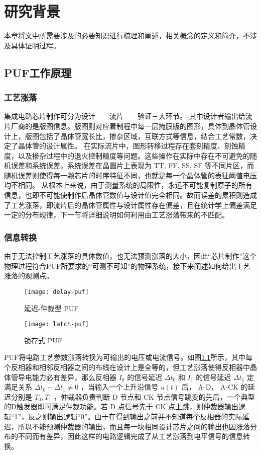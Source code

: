
\chapter{研究背景}\label{chap:preliminary}
本章将文中所需要涉及的必要知识进行梳理和阐述，相关概念的定义和简介，不涉及具体证明过程。

\section{PUF工作原理}%
\subsection{工艺涨落}%
集成电路芯片制作可分为设计——流片——验证三大环节。
其中设计者输出给流片厂商的是版图信息。版图则对应着制程中每一层掩膜版的图形，具体到晶体管设计上，版图包括了晶体管宽长比，掺杂区域，互联方式等信息，结合工艺常数，决定了晶体管的设计属性。
在实际流片中，图形转移过程存在套刻精度、刻蚀精度，以及掺杂过程中的退火控制精度等问题。这些操作在实际中存在不可避免的随机误差和系统误差。系统误差在晶圆片上表现为 TT, FF, SS, SF 等不同片区，而随机误差则使得每一颗芯片的时序特征不同，也就是每一个晶体管的表征阈值电压均不相同。
从根本上来说，由于测量系统的局限性，永远不可能复制原子的所有信息，也即不可能使制作后晶体管数值与设计值完全相同。故而误差的累积则造成了工艺涨落，即流片后的晶体管属性与设计属性存在偏差，且在统计学上偏差满足一定的分布规律，下一节将详细说明如何利用由工艺涨落带来的不匹配。
\subsection{信息转换}
由于无法控制工艺涨落的具体数值，也无法预测涨落的大小，因此``芯片制作''这个物理过程符合PUF所要求的``可测不可知''的物理系统，接下来阐述如何给出工艺涨落的观测点。

\begin{figure}[htb!]
\centering
\texttt{[image: delay-puf]}
\caption{延迟-仲裁型 PUF}
\label{fig:delay-puf}
\end{figure}
 
 \begin{figure}[htb!]
 \centering
 \texttt{[image: latch-puf]}
 \caption{锁存式 PUF}
 \label{fig:latch-puf}
 \end{figure}

PUF将电路工艺参数涨落转换为可输出的电压或电流信号。如图\ref{fig:delay-puf}所示，其中每个反相器和相邻反相器之间的布线在设计上是全等的，但工艺涨落使得反相器中晶体管导电能力必有差异，那么反相器 $ I_0 $ 的信号延迟 $ \Delta t_0 $ 和 $ I_1 $ 的信号延迟 $ \Delta t_1 $ 定满足关系 $ \Delta t_0-\Delta t_1\neq 0 $ ，当输入一个上升沿信号 $ u(t) $ 后， A-D， A-CK  的延迟分别是 $ T_0,T_1 $ ，仲裁器负责判断 D 节点和 CK 节点信号跳变的先后，一个典型的D触发器即可满足仲裁功能。若 D 点信号先于 CK 点上跳，则仲裁器输出逻辑``1''，反之则输出逻辑``0''。由于在得到输出之前并不知道每个反相器的实际延迟，所以不能预测仲裁器的输出，而且每一块相同设计芯片之间的输出也因涨落分布的不同而有差异，因此这样的电路逻辑完成了从工艺涨落到电平信号的信息转换。

